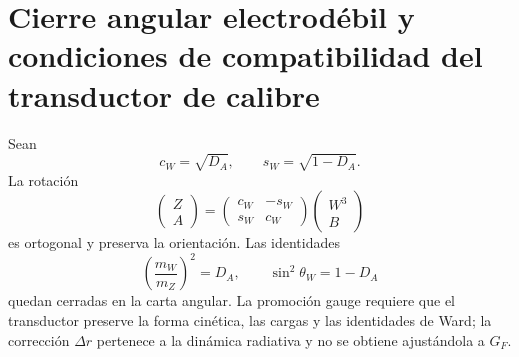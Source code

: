 \section{Cierre angular electrodébil y condiciones de compatibilidad del transductor de calibre}
\label{sec:p3-final:cierre-electrodebil}

Sean
\[
 c_W=\sqrt{D_A},
 \qquad
 s_W=\sqrt{1-D_A}.
\]
La rotación
\[
 \begin{pmatrix}Z\\A\end{pmatrix}
 =
 \begin{pmatrix}c_W&-s_W\\s_W&c_W\end{pmatrix}
 \begin{pmatrix}W^3\\B\end{pmatrix}
\]
es ortogonal y preserva la orientación. Las identidades
\[
 \left(\frac{m_W}{m_Z}\right)^2=D_A,
 \qquad
 \sin^2\theta_W=1-D_A
\]
quedan cerradas en la carta angular. La promoción gauge requiere que el
transductor preserve la forma cinética, las cargas y las identidades de Ward;
la corrección \(\Delta r\) pertenece a la dinámica radiativa y no se obtiene
ajustándola a \(G_F\).

